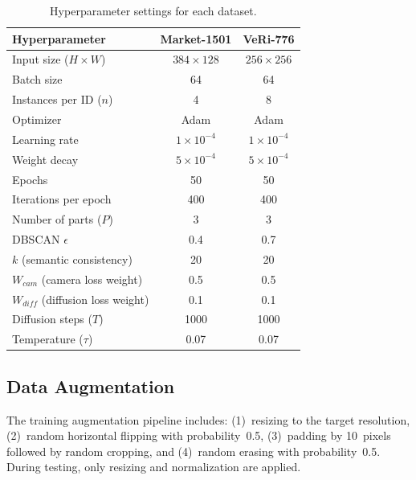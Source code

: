 \begin{table}[H]
    \centering
    \caption{Hyperparameter settings for each dataset.}
    \label{tab:hyperparams}
    \begin{tabular}{l c c}
        \toprule
        \textbf{Hyperparameter} & \textbf{Market-1501} & \textbf{VeRi-776} \\
        \midrule
        Input size ($H \times W$)        & $384 \times 128$  & $256 \times 256$  \\
        Batch size                        & 64                & 64                \\
        Instances per ID ($n$)            & 4                 & 8                 \\
        Optimizer                         & Adam              & Adam              \\
        Learning rate                     & $1 \times 10^{-4}$ & $1 \times 10^{-4}$ \\
        Weight decay                      & $5 \times 10^{-4}$ & $5 \times 10^{-4}$ \\
        Epochs                            & 50                & 50                \\
        Iterations per epoch              & 400               & 400               \\
        Number of parts ($P$)             & 3                 & 3                 \\
        DBSCAN $\epsilon$                 & 0.4               & 0.7               \\
        $k$ (semantic consistency)        & 20                & 20                \\
        $W_{cam}$ (camera loss weight)    & 0.5               & 0.5               \\
        $W_{diff}$ (diffusion loss weight) & 0.1              & 0.1               \\
        Diffusion steps ($T$)             & 1000              & 1000              \\
        Temperature ($\tau$)              & 0.07              & 0.07              \\
        \bottomrule
    \end{tabular}
\end{table}

\subsection{Data Augmentation}
The training augmentation pipeline includes: (1)~resizing to the target resolution, (2)~random horizontal flipping with probability~0.5, (3)~padding by 10~pixels followed by random cropping, and (4)~random erasing with probability~0.5. During testing, only resizing and normalization are applied.

